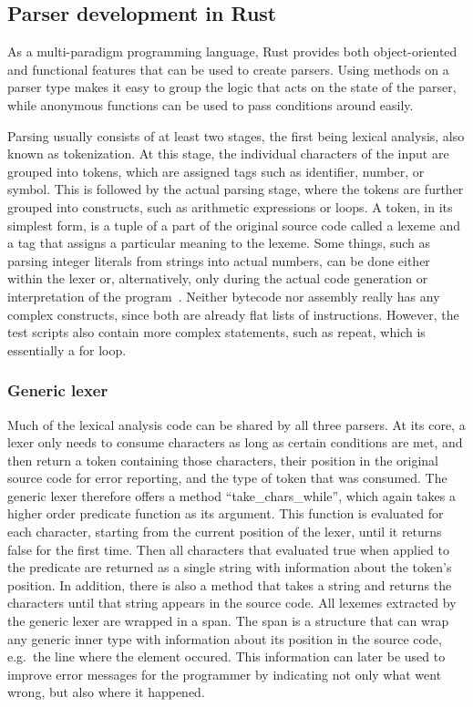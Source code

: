 \subsection{Parser development in Rust} \label{parser-dev}
As a multi-paradigm programming language, Rust provides both object-oriented and functional features that can be used to create parsers.
Using methods on a parser type makes it easy to group the logic that acts on the state of the parser, while anonymous functions can be used to pass conditions around easily.

Parsing usually consists of at least two stages, the first being lexical analysis, also known as tokenization.
At this stage, the individual characters of the input are grouped into tokens, which are assigned tags such as identifier, number, or symbol.
This is followed by the actual parsing stage, where the tokens are further grouped into constructs, such as arithmetic expressions or loops.
A token, in its simplest form, is a tuple of a part of the original source code called a lexeme and a tag that assigns a particular meaning to the lexeme. Some things, such as parsing integer literals from strings into actual numbers, can be done either within the lexer or, alternatively, only during the actual code generation or interpretation of the program~\cite{nystrom2021crafting}.
Neither bytecode nor assembly really has any complex constructs, since both are already flat lists of instructions.
However, the test scripts also contain more complex statements, such as repeat, which is essentially a for loop.

\subsubsection{Generic lexer}
Much of the lexical analysis code can be shared by all three parsers. At its core, a lexer only needs to consume characters as long as certain conditions are met, and then return a token containing those characters, their position in the original source code for error reporting, and the type of token that was consumed.
The generic lexer therefore offers a method ``take\_chars\_while'', which again takes a higher order predicate function as its argument. This function is evaluated for each character, starting from the current position of the lexer, until it returns false for the first time. Then all characters that evaluated true when applied to the predicate are returned as a single string with information about the token's position.
In addition, there is also a method that takes a string and returns the characters until that string appears in the source code.
\label{spans}
All lexemes extracted by the generic lexer are wrapped in a span. The span is a structure that can wrap any generic inner type with information about its position in the source code, e.g.\ the line where the element occured.
This information can later be used to improve error messages for the programmer by indicating not only what went wrong, but also where it happened.

